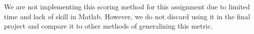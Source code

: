 \documentclass[11pt]{article}
\begin{document}
We are not implementing this scoring method for this assignment due to limited time and lack of skill in Matlab. However, we do not discard using it in the final project and compare it to other methods of generalizing this metric.


\end{document}
